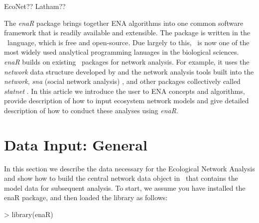 \documentclass[article]{jss}
\begin{document}
EcoNet??  Latham??

The \textit{enaR} package brings together ENA algorithms into one
common software framework that is readily available and extensible.
The package is written in the \R\ language, which is free and
open-source.  Due largely to this, \R\ is now one of the most widely
used analytical programming lanuages in the biological
sciences. \textit{enaR} builds on existing \R\ packages for
network analysis. For example, it uses the \textit{network} data
structure developed by \citet{butts08_network} and the network
analysis tools built into the \textit{network}, \textit{sna} (social
network analysis) \citep{butts08_social}, and other packages
collectively called \textit{statnet} \citep{handcock2008statnet}. In
this article we introduce the user to ENA concepts and algorithms,
provide description of how to input ecosystem network models and give
detailed description of how to conduct these analyses using
\textit{enaR}.








\section{Data Input: General}
In this section we describe the data necessary for the Ecological
Network Analysis and show how to build the central network data object
in \R\ that contains the model data for subsequent analysis.  To
start, we assume you have installed the enaR package, and then loaded
the library as follows:



\begin{Schunk}
\begin{Sinput}
> library(enaR)
\end{Sinput}
\end{Schunk}
\end{document}
